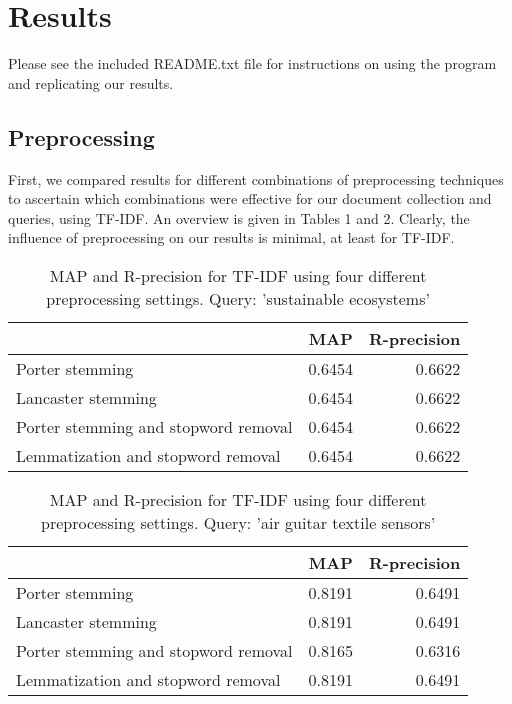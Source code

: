 \documentclass{article}
\begin{document}
\section*{Results}

Please see the included README.txt file for instructions on using the program and replicating our results.

\subsection*{Preprocessing}

First, we compared results for different combinations of preprocessing techniques to ascertain which combinations were effective for our document collection and queries, using TF-IDF. An overview is given in Tables 1 and 2. Clearly, the influence of preprocessing on our results is minimal, at least for TF-IDF.

\begin{table}[h]
\begin{tabular}{|l|c|r|}
\hline
 & MAP & R-precision \\ \hline
Porter stemming & 0.6454 & 0.6622 \\ \hline
Lancaster stemming & 0.6454 & 0.6622 \\ \hline
Porter stemming and stopword removal & 0.6454 & 0.6622 \\ \hline
Lemmatization and stopword removal & 0.6454 & 0.6622 \\ \hline
\end{tabular}
\caption{MAP and R-precision for TF-IDF using four different preprocessing settings. Query: 'sustainable ecosystems'}
\end{table}
\begin{table}[h]
\begin{tabular}{|l|c|r|}
\hline
 & MAP & R-precision \\ \hline
Porter stemming & 0.8191 & 0.6491 \\ \hline
Lancaster stemming & 0.8191 & 0.6491 \\ \hline
Porter stemming and stopword removal & 0.8165 & 0.6316 \\ \hline
Lemmatization and stopword removal & 0.8191 & 0.6491 \\ \hline
\end{tabular}
\caption{MAP and R-precision for TF-IDF using four different preprocessing settings. Query: 'air guitar textile sensors'} 
\end{table} 
\end{document}
